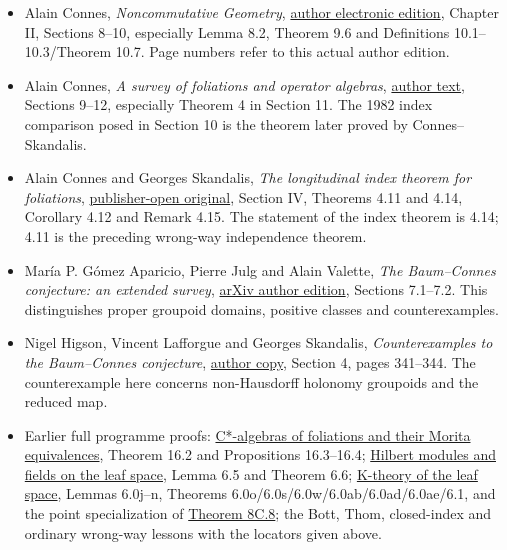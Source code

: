 \documentclass[
  11pt,
]{article}
\providecommand{\tightlist}{%
  \setlength{\itemsep}{0pt}\setlength{\parskip}{0pt}}
\begin{document}
\begin{itemize}
\tightlist
\item
  Alain Connes, \emph{Noncommutative Geometry},
  \href{https://alainconnes.org/wp-content/uploads/book94bigpdf.pdf}{author
  electronic edition}, Chapter II, Sections 8--10, especially Lemma 8.2,
  Theorem 9.6 and Definitions 10.1--10.3/Theorem 10.7. Page numbers
  refer to this actual author edition.
\item
  Alain Connes, \emph{A survey of foliations and operator algebras},
  \href{https://alainconnes.org/wp-content/uploads/foliationsfine.pdf}{author
  text}, Sections 9--12, especially Theorem 4 in Section 11. The 1982
  index comparison posed in Section 10 is the theorem later proved by
  Connes--Skandalis.
\item
  Alain Connes and Georges Skandalis, \emph{The longitudinal index
  theorem for foliations},
  \href{https://ems.press/content/serial-article-files/42241}{publisher-open
  original}, Section IV, Theorems 4.11 and 4.14, Corollary 4.12 and
  Remark 4.15. The statement of the index theorem is 4.14; 4.11 is the
  preceding wrong-way independence theorem.
\item
  María P. Gómez Aparicio, Pierre Julg and Alain Valette, \emph{The
  Baum--Connes conjecture: an extended survey},
  \href{https://arxiv.org/abs/1905.10081}{arXiv author edition},
  Sections 7.1--7.2. This distinguishes proper groupoid domains,
  positive classes and counterexamples.
\item
  Nigel Higson, Vincent Lafforgue and Georges Skandalis,
  \emph{Counterexamples to the Baum--Connes conjecture},
  \href{https://vlafforg.perso.math.cnrs.fr/files/counterex.pdf}{author
  copy}, Section 4, pages 341--344. The counterexample here concerns
  non-Hausdorff holonomy groupoids and the reduced map.
\item
  Earlier full programme proofs:
  \href{../KT-CP/KT-CP-16.html}{C*-algebras of foliations and their
  Morita equivalences}, Theorem 16.2 and Propositions 16.3--16.4;
  \href{../NCG-FOLIATIONS/hilbert-modules-and-fields-on-the-leaf-space.html\#section-6}{Hilbert
  modules and fields on the leaf space}, Lemma 6.5 and Theorem 6.6;
  \href{../NCG-FOLIATIONS/k-theory-of-the-leaf-space.html\#section-6}{K-theory
  of the leaf space}, Lemmas 6.0j--n, Theorems
  6.0o/6.0s/6.0w/6.0ab/6.0ad/6.0ae/6.1, and the point specialization of
  \href{../NCG-FOLIATIONS/k-theory-of-the-leaf-space.html\#section-8c}{Theorem
  8C.8}; the Bott, Thom, closed-index and ordinary wrong-way lessons
  with the locators given above.
\end{itemize}
\end{document}
